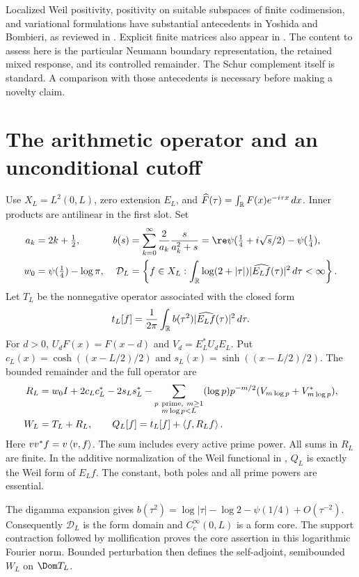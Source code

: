 Localized Weil positivity, positivity on suitable subspaces of finite
codimension, and variational formulations have substantial antecedents in
Yoshida and Bombieri, as reviewed in \cite[Section 1]{Suzuki}. Explicit finite
matrices also appear in \cite{CCM}. The content to assess here is the particular
Neumann boundary representation, the retained mixed response, and its controlled
remainder. The Schur complement itself is standard. A comparison with those
antecedents is necessary before making a novelty claim.

\section{The arithmetic operator and an unconditional cutoff}
Use $X_L=L^2(0,L)$, zero extension $E_L$, and
$\widehat F(\tau)=\int_\mathbb R F(x)e^{-i\tau x}\,dx$. Inner products are
antilinear in the first slot. Set
\begin{align}
a_k&=2k+\tfrac12,&
b(s)&=\sum_{k=0}^{\infty}\frac2{a_k}\frac{s}{a_k^2+s}
=\re\psi(\tfrac14+i\sqrt{s}/2)-\psi(\tfrac14),\label{eq:b}\\
w_0&=\psi(\tfrac14)-\log\pi,&
\mathcal D_L&=\left\{f\in X_L:
\int_\R\log(2+|\tau|)|\widehat{E_Lf}(\tau)|^2\,d\tau<\infty\right\}.
\end{align}
Let $T_L$ be the nonnegative operator associated with the closed form
\[
t_L[f]=\frac1{2\pi}\int_\mathbb R b(\tau^2)|\widehat{E_Lf}(\tau)|^2\,d\tau.
\]
For $d>0$, $U_dF(x)=F(x-d)$ and $V_d=E_L^*U_dE_L$. Put
$c_L(x)=\cosh((x-L/2)/2)$ and $s_L(x)=\sinh((x-L/2)/2)$.
The bounded remainder and the full operator are
\begin{align}
R_L={}&w_0I+2c_Lc_L^*-2s_Ls_L^*
-\sum_{\substack{p\ \mathrm{prime},\ m\ge1\\m\log p<L}}
 (\log p)p^{-m/2}(V_{m\log p}+V_{m\log p}^*),\label{eq:remainder}\\
W_L={}&T_L+R_L,\qquad Q_L[f]=t_L[f]+\left\langle f,R_Lf\right\rangle.\label{eq:weil}
\end{align}
Here $vv^*f=v\left\langle v,f\right\rangle$. The sum includes every active prime power.
All sums in $R_L$ are finite. In the additive normalization of the Weil
functional in \cite[Section 1.1]{Suzuki}, $Q_L$ is exactly the Weil form of
$E_Lf$. The constant, both poles and all prime powers are essential.

The digamma expansion \cite{DLMF} gives
$b(\tau^2)=\log|\tau|-\log2-\psi(1/4)+O(\tau^{-2})$.
Consequently $\mathcal D_L$ is the form domain and $C_c^\infty(0,L)$ is
a form core. The support contraction followed by mollification proves the
core assertion in this logarithmic Fourier norm. Bounded perturbation then
defines the self-adjoint, semibounded $W_L$ on $\Dom T_L$.

